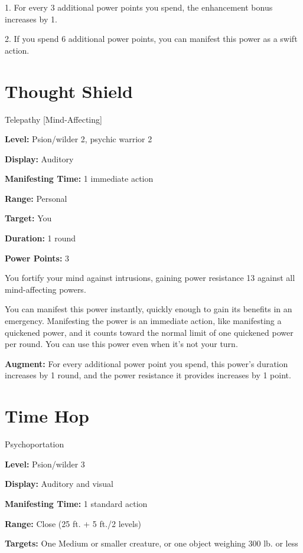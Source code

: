 \documentclass{article}
\begin{document}
1. For every 3 additional power points you spend, the enhancement bonus increases 
by 1.

2. If you spend 6 additional power points, you can manifest this power as a swift 
action.

\vspace{12pt}
\section*{Thought Shield}

Telepathy [Mind-Affecting]

\textbf{Level:} Psion/wilder 2, psychic warrior 2

\textbf{Display:} Auditory

\textbf{Manifesting Time:} 1 immediate action

\textbf{Range:} Personal

\textbf{Target:} You

\textbf{Duration:} 1 round

\textbf{Power Points:} 3

You fortify your mind against intrusions, gaining power resistance 13 against all 
mind-affecting powers.

You can manifest this power instantly, quickly enough to gain its benefits in an 
emergency. Manifesting the power is an immediate action, like manifesting a quickened 
power, and it counts toward the normal limit of one quickened power per round. 
You can use this power even when it's not your turn.

\textbf{Augment:} For every additional power point you spend, this power's duration 
increases by 1 round, and the power resistance it provides increases by 1 point.

\vspace{12pt}
\section*{Time Hop}

Psychoportation

\textbf{Level:} Psion/wilder 3

\textbf{Display:} Auditory and visual

\textbf{Manifesting Time:} 1 standard action

\textbf{Range:} Close (25 ft. + 5 ft./2 levels)

\textbf{Targets:} One Medium or smaller creature, or one object weighing 300 lb. 
or less
\end{document}
